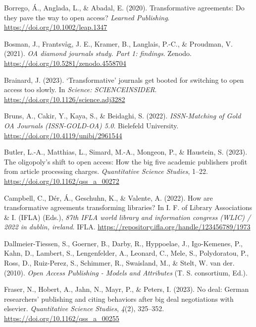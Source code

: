 \documentclass[a4paper,man,floatsintext,longtable,noextraspace,12pt]{apa6}
\newenvironment{CSLReferences}%
  {}%
  {\par}
\begin{document}
\begin{CSLReferences}{1}{0}
\leavevmode{}%
Borrego, Á., Anglada, L., \& Abadal, E. (2020). Transformative
agreements: Do they pave the way to open access? \emph{Learned
Publishing}. \url{https://doi.org/10.1002/leap.1347}

\leavevmode{}%
Bosman, J., Frantsvåg, J. E., Kramer, B., Langlais, P.-C., \& Proudman,
V. (2021). \emph{OA diamond journals study. Part 1: findings}. Zenodo.
\url{https://doi.org/10.5281/zenodo.4558704}

\leavevmode{}%
Brainard, J. (2023). {`Transformative'} journals get booted for
switching to open access too slowly. In \emph{Science: SCIENCEINSIDER}.
\url{https://doi.org/10.1126/science.adj3282}

\leavevmode{}%
Bruns, A., Cakir, Y., Kaya, S., \& Beidaghi, S. (2022).
\emph{{ISSN-Matching of Gold OA Journals (ISSN-GOLD-OA) 5.0}}. Bielefeld
University. \url{https://doi.org/10.4119/unibi/2961544}

\leavevmode{}%
Butler, L.-A., Matthias, L., Simard, M.-A., Mongeon, P., \& Haustein, S.
(2023). The oligopoly's shift to open access: How the big five academic
publishers profit from article processing charges. \emph{Quantitative
Science Studies}, 1--22. \url{https://doi.org/10.1162/qss_a_00272}

\leavevmode{}%
Campbell, C., Dér, Á., Geschuhn, K., \& Valente, A. (2022). How are
transformative agreements transforming libraries? In I. F. of Library
Associations \& I. (IFLA) (Eds.), \emph{87th IFLA world library and
information congress (WLIC) / 2022 in dublin, ireland}. IFLA.
\url{https://repository.ifla.org/handle/123456789/1973}

\leavevmode{}%
Dallmeier-Tiessen, S., Goerner, B., Darby, R., Hyppoelae, J.,
Igo-Kemenes, P., Kahn, D., Lambert, S., Lengenfelder, A., Leonard, C.,
Mele, S., Polydoratou, P., Ross, D., Ruiz-Perez, S., Schimmer, R.,
Swaisland, M., \& Stelt, W. van der. (2010). \emph{{Open Access
Publishing - Models and Attributes}} (T. S. consortium, Ed.).

\leavevmode{}%
Fraser, N., Hobert, A., Jahn, N., Mayr, P., \& Peters, I. (2023). No
deal: German researchers' publishing and citing behaviors after big deal
negotiations with elsevier. \emph{Quantitative Science Studies},
\emph{4}(2), 325--352. \url{https://doi.org/10.1162/qss_a_00255}


\end{CSLReferences}
\end{document}
